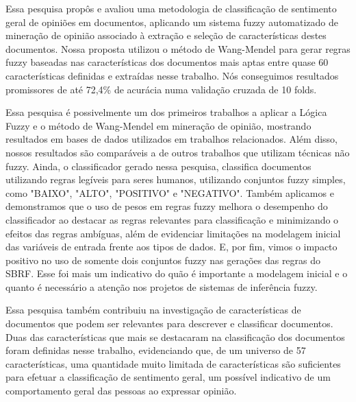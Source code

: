 \documentclass[template.tex]{subfiles}
\begin{document}

Essa pesquisa propôs e avaliou  uma metodologia de classificação de sentimento geral de opiniões em documentos, aplicando um sistema fuzzy automatizado de mineração de opinião associado à extração e seleção de características destes documentos. Nossa proposta utilizou o método de Wang-Mendel \cite{wang1992generating} para gerar regras fuzzy baseadas nas características dos documentos mais aptas entre quase 60 características definidas e extraídas nesse trabalho. Nós conseguimos resultados promissores de até 72,4\% de acurácia numa validação cruzada de 10 folds.

Essa pesquisa é possivelmente um dos primeiros trabalhos a aplicar a Lógica Fuzzy e o método de Wang-Mendel em mineração de opinião, mostrando resultados em bases de dados utilizados em trabalhos relacionados. Além disso, nossos resultados são comparáveis a de outros trabalhos que utilizam técnicas não fuzzy. Ainda, o classificador gerado nessa pesquisa, classifica documentos utilizando regras legíveis para seres humanos, utilizando conjuntos fuzzy simples, como "BAIXO", "ALTO", "POSITIVO" e "NEGATIVO". Também aplicamos e demonstramos que o uso de pesos em regras fuzzy melhora o desempenho do classificador ao destacar as regras relevantes para classificação e minimizando o efeitos das regras ambíguas, além de evidenciar limitações na modelagem inicial das variáveis de entrada frente aos tipos de dados. E, por fim, vimos o impacto positivo no uso de somente dois conjuntos fuzzy nas gerações das regras do SBRF. Esse foi mais um indicativo do quão é importante a modelagem inicial e o quanto é necessário a atenção nos projetos de sistemas de inferência fuzzy.


Essa pesquisa também contribuiu na investigação de características de documentos que podem ser relevantes para descrever e classificar documentos. Duas das características que mais se destacaram na classificação dos documentos foram definidas nesse trabalho, evidenciando que, de um universo de 57 características, uma quantidade muito limitada de características são suficientes para efetuar a classificação de sentimento geral, um possível indicativo de um comportamento geral das pessoas ao expressar opinião.
\end{document}

